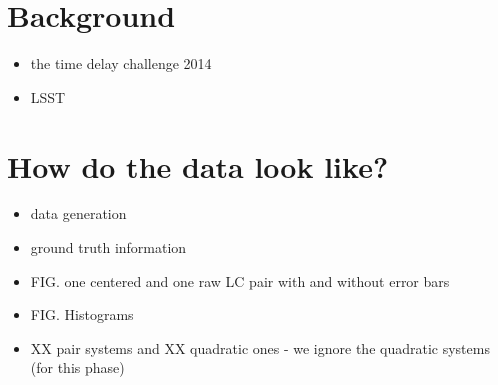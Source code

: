 \documentclass[a4paper, 11pt]{article}
\begin{document}
\section{Background}
  \begin{itemize}
    \item the time delay challenge 2014
    \item LSST
  \end{itemize}

\section{How do the data look like?}
  \begin{itemize}
    \item data generation
    \item ground truth information
    \item FIG. one centered and one raw LC pair with and without error bars
    \item FIG. Histograms
    \item XX pair systems and XX quadratic ones - we ignore the quadratic systems (for this phase)
  \end{itemize}
\end{document}
